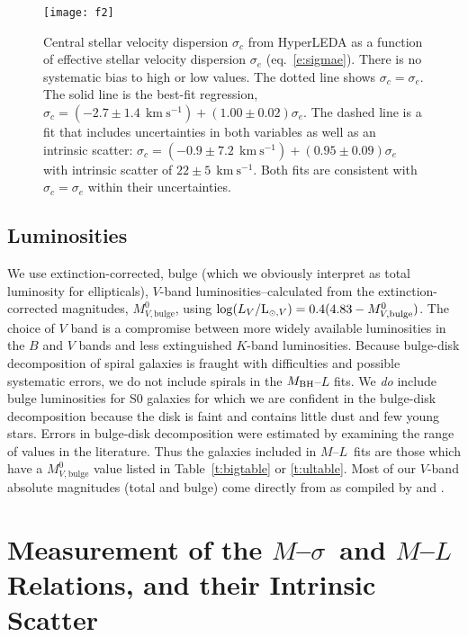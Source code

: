 \documentclass[twosided,letterpaper,numberedappendix]{emulateapj}
\newcommand{\kms}      {\ensuremath{~\mathrm{km~s^{-1}}}}
\newcommand{\msigma}   {\ensuremath{M}{--}\ensuremath{\sigma}}
\newcommand{\ml}       {\ensuremath{M}{--}\ensuremath{L}}
\begin{document}
\begin{figure}[htb]
\centering
\texttt{[image: f2]}
\caption{Central stellar velocity dispersion $\sigma_c$ from HyperLEDA
as a function of effective stellar velocity dispersion $\sigma_e$
(eq.~\ref{e:sigmae}).  There is no systematic bias to high or low
values.  The dotted line shows $\sigma_c = \sigma_e$.  The solid line
is the best-fit regression, $\sigma_c = (-2.7 \pm 1.4~\kms) + (1.00
\pm 0.02)\sigma_e$.  The dashed line is a fit that includes
uncertainties in both variables as well as an intrinsic scatter:
$\sigma_c = (-0.9 \pm 7.2~\kms) + (0.95 \pm 0.09)\sigma_e$ with
intrinsic scatter of $22 \pm 5~\kms$.  Both fits are consistent with
$\sigma_c = \sigma_e$ within their uncertainties.  }
\label{f:sigmasigma}
\end{figure}


\subsection{Luminosities}
We use extinction-corrected, bulge (which we obviously interpret as
total luminosity for ellipticals), $V$-band luminosities--calculated
from the extinction-corrected magnitudes, $M_{V,{\mathrm{bulge}}}^0$,
using $\log(L_V / {\rm L}_{{\scriptscriptstyle \odot}, V}) = 0.4 (4.83
- M_{V,{\mathrm{bulge}}}^0)$.  The choice of $V$ band is a compromise
between more widely available luminosities in the $B$ and $V$ bands
and less extinguished $K$-band luminosities.  Because bulge-disk
decomposition of spiral galaxies is fraught with difficulties and
possible systematic errors, we do not include spirals in the $M_{\rm
BH}$--$L$ fits.  We \emph{do} include bulge luminosities for S0
galaxies for which we are confident in the bulge-disk decomposition
because the disk is faint and contains little dust and few young
stars.  Errors in bulge-disk decomposition were estimated by examining
the range of values in the literature.  Thus the galaxies included in
\ml\ fits are those which have a $M_{V,{\mathrm{bulge}}}^0$ value
listed in Table~\ref{t:bigtable} or \ref{t:ultable}.  Most of our
$V$-band absolute magnitudes (total and bulge) come directly from
\citet{rc3} as compiled by \citet{laueretal05} and
\citet{laueretal07b}.


\section{Measurement of the \texorpdfstring{\msigma\ and 
$M$--$L$}{M-sigma and M-L} Relations, and their Intrinsic Scatter}
\end{document}
